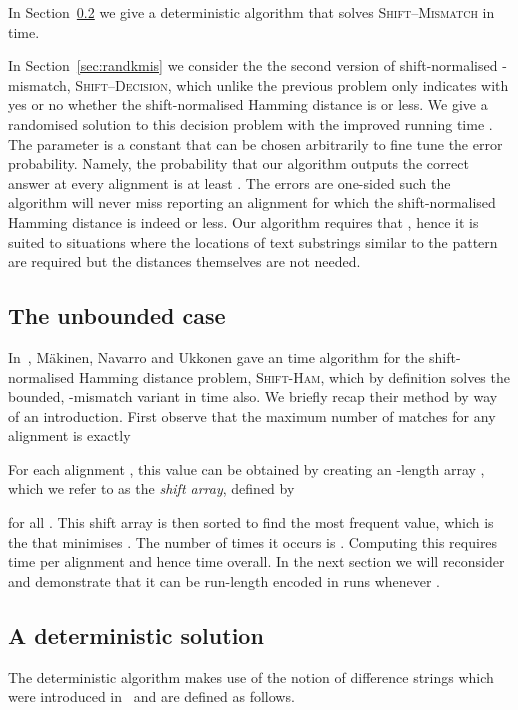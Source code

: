 \documentclass[11pt]{article}
\newcommand{\sHam}{\textsc{Shift-Ham}\xspace}
\newcommand{\skMismatch}{\textsc{Shift--Mismatch}\xspace}
\newcommand{\skDecision}{\textsc{Shift--Decision}\xspace}
\theoremstyle{plain}
\theoremstyle{definition}
\begin{document}
In Section~\ref{sec:detkmis} we give a deterministic algorithm that solves \skMismatch in  time.

In Section~\ref{sec:randkmis} we consider the the second version of shift-normalised -mismatch, \skDecision, which unlike the previous problem only indicates with yes or no whether the shift-normalised Hamming distance is  or less. We give a randomised solution to this decision problem with the improved running time . The parameter  is a constant that can be chosen arbitrarily to fine tune the error probability. Namely, the probability that our algorithm outputs the correct answer at every alignment is at least . The errors are one-sided such the algorithm will never miss reporting an alignment for which the shift-normalised Hamming distance is indeed  or less. Our algorithm requires that , hence it is suited to situations where the locations of text substrings similar to the pattern are required but the distances themselves are not needed.


\subsection{The unbounded case}\label{sec:unbounded}

In~\cite{MNU:2005}, M\"{a}kinen, Navarro and Ukkonen gave an  time algorithm for the shift-normalised Hamming distance problem, \sHam, which by definition solves the bounded, -mismatch variant in   time also. We briefly recap their method by way of an introduction. First observe that the maximum number of matches for any alignment is exactly

For each alignment , this value can be obtained by creating an -length array , which we refer to as the \emph{shift array}, defined by

for all . This shift array is then sorted to find the most frequent value, which is the  that minimises . The number of times it occurs is . Computing this requires  time per alignment and hence  time overall. In the next section we will reconsider  and demonstrate that it can be run-length encoded in  runs whenever .


\subsection{A deterministic solution}\label{sec:detkmis}

The deterministic algorithm makes use of the notion of difference strings which were introduced in~\cite{LU:2000} and are defined as follows.
\end{document}
